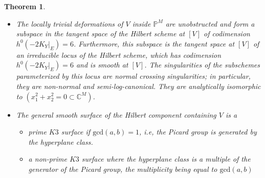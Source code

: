 \documentclass[11pt,twoside]{amsart}
\theoremstyle{plain}
\numberwithin{equation}{section}
\newtheorem{theorem}{Theorem}[section]
\theoremstyle{definition}
\begin{document}
\begin{theorem}
\begin{itemize}
    \smallskip
    
    \item[(2)] The locally trivial deformations of $V$ inside $\mathbb{P}^M$ are unobstructed and form a subspace in the tangent space of the Hilbert scheme at $[V]$ of codimension $h^0(-2K_Y|_E) = 6$. Furthermore, this subspace is the tangent space at $[V]$ of an irreducible locus of the Hilbert scheme, which has codimension $h^0(-2K_Y|_E) = 6$ and is smooth at $[V]$. The singularities of the subschemes parameterized by this locus are normal crossing singularities;  in particular, they are non-normal and semi-log-canonical. They are analytically isomorphic to $(x_1^2+x_2^2 = 0 \subset \mathbb{C}^M)$. 
    \smallskip
    
    \item[(3)] The general smooth surface of the Hilbert component containing $V$ is a 
    \begin{itemize}
        \item[(a)] prime $K3$ surface if $\textrm{gcd}(a,b) = 1$, i.e, the Picard group is generated by the hyperplane class.
        \item[(b)] a non-prime $K3$ surface where the hyperplane class is a multiple of the generator of the Picard group, the multiplicity being equal to $\textrm{gcd}(a,b)$
    \end{itemize}
\end{itemize}

\end{theorem}
\end{document}
